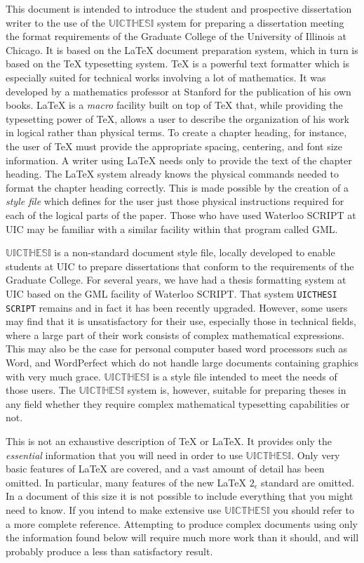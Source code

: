 \documentclass{uicthesi}
\newcommand{\uicthesi}{{$\mathbb{UICTHESI}$}}
\begin{document}
 
This document is intended to introduce the student and prospective
dissertation writer to the use of the \uicthesi{} system
for preparing a dissertation meeting the format requirements
of the Graduate College of the University of Illinois at Chicago.
It is based on the \LaTeX{} document preparation system, which in turn
is based on the \TeX{} typesetting system.
\TeX{} is a powerful text formatter which is especially suited for
technical works involving a lot of mathematics. It was developed
by a mathematics professor at Stanford for the publication of his
own books.
\LaTeX{} is a {\em macro} facility built on top of \TeX{} that,
while providing the typesetting power of \TeX{}, allows a user to
describe the organization of his work in logical rather than
physical terms.
To create a chapter heading, for instance, the user of \TeX{} must
provide the appropriate spacing, centering, and font size information.
A writer using \LaTeX{}
needs only to provide the text of the chapter heading.
The \LaTeX{} system already knows the physical commands needed to
format the chapter heading correctly.
This is made possible by the creation of a {\em style file} which
defines for the user just those physical instructions required for each
of the logical parts of the paper.
Those who have used Waterloo SCRIPT at UIC may be familiar with
a similar facility within that program called GML.
 
\uicthesi{} is a non-standard document style file, locally developed to
enable students at UIC to prepare dissertations that conform to the
requirements of the Graduate College.
For several years, we have had a thesis formatting system at UIC
based on the GML facility of Waterloo SCRIPT.
That system {\tt UICTHESI SCRIPT}
remains and in fact it has been recently upgraded.
However, some users may find that it is unsatisfactory for their
use, especially those in technical fields, where a large part of
their work consists of complex mathematical expressions. This may also be
the case for personal computer based word processors such as Word, and
WordPerfect which do not handle large documents containing graphics with
very much grace.
\uicthesi{} is a style file intended to meet the needs of those users.
The \uicthesi{} system is, however, suitable for preparing theses
in any field whether they require complex mathematical
typesetting capabilities or not.
 
This is not an exhaustive description of \TeX{} or \LaTeX{}.
It provides only the {\em essential} information that you
will need in order to use \uicthesi{}.
Only very basic features of \LaTeX{} are covered, and a
vast amount of detail has been omitted. In particular, many features of the new \LaTeX{} $2_\epsilon$ standard are omitted. In a document of this size
it is not possible to include everything that you might need to know.
If you intend to make extensive use \uicthesi{} you should
refer to a more complete reference.  Attempting to produce complex
documents using only the information found below will require
much more work than it should, and will probably produce a less
than satisfactory result.
 
\end{document}
